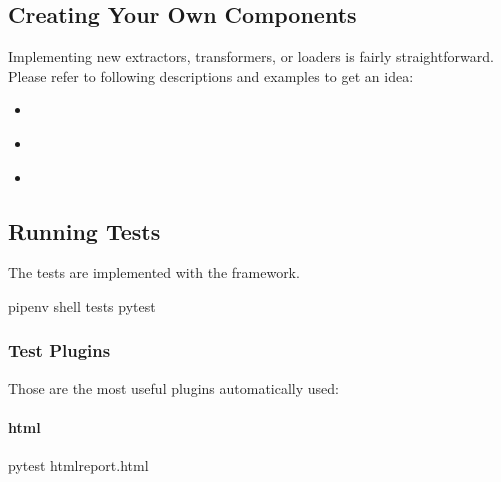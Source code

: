 \documentclass[a4paper,10pt, twoside,english]{sphinxmanual}
\begin{document}
\subsection{Creating Your Own Components}
\label{\detokenize{setup_development_testing:creating-your-own-components}}
Implementing new extractors, transformers, or loaders is fairly straightforward.
Please refer to following descriptions and examples to get an idea:
\begin{itemize}
\item {} 
{\hyperref[\detokenize{base_classes/extractor:custom-extractor}]{}}

\item {} 
{\hyperref[\detokenize{base_classes/transformer:custom-transformer}]{}}

\item {} 
{\hyperref[\detokenize{base_classes/loader:custom-loader}]{}}

\end{itemize}


\subsection{Running Tests}
\label{\detokenize{setup_development_testing:running-tests}}
The tests are implemented with the  framework.
\def\sphinxLiteralBlockLabel{\label{\detokenize{setup_development_testing:id12}}}
\begin{sphinxVerbatim}[commandchars=\\\{\}]
\PYGZdl{} pipenv shell
\PYGZdl{}  tests
\PYGZdl{} pytest
\end{sphinxVerbatim}


\subsubsection{Test Plugins}
\label{\detokenize{setup_development_testing:test-plugins}}
Those are the most useful plugins automatically used:


\paragraph{html}
\label{\detokenize{setup_development_testing:id1}}
\def\sphinxLiteralBlockLabel{\label{\detokenize{setup_development_testing:id13}}}
\begin{sphinxVerbatim}[commandchars=\\\{\}]
\PYGZdl{} pytest \PYGZhy{}\PYGZhy{}htmlreport.html
\end{sphinxVerbatim}
\end{document}
